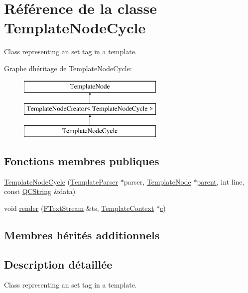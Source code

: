 \hypertarget{class_template_node_cycle}{}\section{Référence de la classe Template\+Node\+Cycle}
\label{class_template_node_cycle}


Class representing an \textquotesingle{}set\textquotesingle{} tag in a template.  


Graphe d\textquotesingle{}héritage de Template\+Node\+Cycle\+:\begin{figure}[H]
\begin{center}
\leavevmode
\includegraphics[height=3.000000cm]{class_template_node_cycle}
\end{center}
\end{figure}
\subsection*{Fonctions membres publiques}
\begin{DoxyCompactItemize}
\item 
\hyperlink{class_template_node_cycle_a19dd6fc0b855317dd8d17b9ae8ea24f5}{Template\+Node\+Cycle} (\hyperlink{class_template_parser}{Template\+Parser} $\ast$parser, \hyperlink{class_template_node}{Template\+Node} $\ast$\hyperlink{class_template_node_a69a306ef84e62af9fe57bf9aacc94536}{parent}, int line, const \hyperlink{class_q_c_string}{Q\+C\+String} \&data)
\item 
void \hyperlink{class_template_node_cycle_a01a239419afdf6e9c4b64b6a3f747054}{render} (\hyperlink{class_f_text_stream}{F\+Text\+Stream} \&ts, \hyperlink{class_template_context}{Template\+Context} $\ast$\hyperlink{060__command__switch_8tcl_ab14f56bc3bd7680490ece4ad7815465f}{c})
\end{DoxyCompactItemize}
\subsection*{Membres hérités additionnels}


\subsection{Description détaillée}
Class representing an \textquotesingle{}set\textquotesingle{} tag in a template. 

